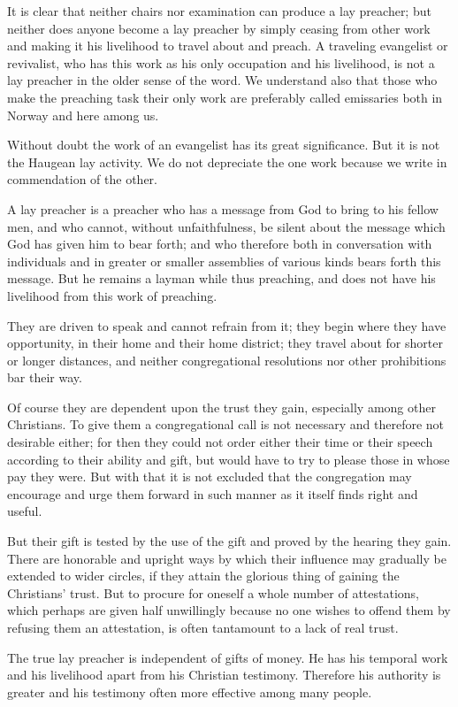 It is clear that neither chairs nor examination can produce a lay preacher; but neither does anyone become a lay preacher by simply ceasing from other work and making it his livelihood to travel about and preach. A traveling evangelist or revivalist, who has this work as his only occupation and his livelihood, is not a lay preacher in the older sense of the word. We understand also that those who make the preaching task their only work are preferably called emissaries both in Norway and here among us.

Without doubt the work of an evangelist has its great significance. But it is not the Haugean lay activity. We do not depreciate the one work because we write in commendation of the other.

A lay preacher is a preacher who has a message from God to bring to his fellow men, and who cannot, without unfaithfulness, be silent about the message which God has given him to bear forth; and who therefore both in conversation with individuals and in greater or smaller assemblies of various kinds bears forth this message. But he remains a layman while thus preaching, and does not have his livelihood from this work of preaching.

They are driven to speak and cannot refrain from it; they begin where they have opportunity, in their home and their home district; they travel about for shorter or longer distances, and neither congregational resolutions nor other prohibitions bar their way.

Of course they are dependent upon the trust they gain, especially among other Christians. To give them a congregational call is not necessary and therefore not desirable either; for then they could not order either their time or their speech according to their ability and gift, but would have to try to please those in whose pay they were. But with that it is not excluded that the congregation may encourage and urge them forward in such manner as it itself finds right and useful.

But their gift is tested by the use of the gift and proved by the hearing they gain. There are honorable and upright ways by which their influence may gradually be extended to wider circles, if they attain the glorious thing of gaining the Christians’ trust. But to procure for oneself a whole number of attestations, which perhaps are given half unwillingly because no one wishes to offend them by refusing them an attestation, is often tantamount to a lack of real trust.

The true lay preacher is independent of gifts of money. He has his temporal work and his livelihood apart from his Christian testimony. Therefore his authority is greater and his testimony often more effective among many people.

